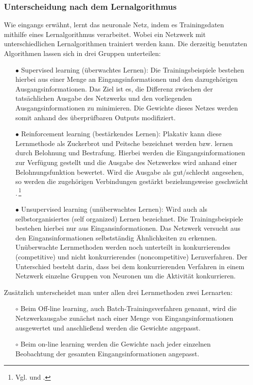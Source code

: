 \subsubsection{Unterscheidung nach dem Lernalgorithmus }
Wie eingangs erwähnt, lernt das neuronale Netz, indem es Trainingsdaten mithilfe eines Lernalgorithmus verarbeitet. Wobei ein Netzwerk mit unterschiedlichen Lernalgorithmen trainiert werden kann. Die derzeitig benutzten Algorithmen lassen sich in drei Gruppen unterteilen: 
\begin{itemize}
\item[\textbf{$\bullet$}] Supervised learning (überwachtes Lernen): Die Trainingsbeispiele bestehen hierbei aus einer Menge an Eingangsinformationen und den dazugehörigen Ausgangsinformationen. Das Ziel ist es, die Differenz zwischen der tatsächlichen Ausgabe des Netzwerks und den vorliegenden Ausgangsinformationen zu minimieren. Die Gewichte dieses Netzes werden somit anhand des überprüfbaren Outputs modifiziert.


\item[\textbf{$\bullet$}] Reinforcement learning (bestärkendes Lernen): Plakativ kann diese Lernmethode als Zuckerbrot und Peitsche bezeichnet werden bzw. lernen durch Belohnung und Bestrafung. Hierbei werden die Eingangsinformationen zur Verfügung gestellt und die Ausgabe des Netzwerkes wird anhand einer Belohnungsfunktion bewertet. Wird die Ausgabe als gut/schlecht angesehen, so werden die zugehörigen Verbindungen gestärkt beziehungsweise geschwächt .\,\footnote{Vgl. \citet[201]{dkriesel07} und \citet[A2.3:5]{Fiesler96}.}


\item[\textbf{$\bullet$}] Unsupervised learning (unüberwachtes Lernen): Wird auch als selbstorganisiertes (self organized) Lernen bezeichnet. Die Trainingsbeispiele bestehen hierbei nur aus Eingansinformationen. Das Netzwerk versucht aus den Eingansinformationen selbstständig Ähnlichkeiten zu erkennen. Unüberwachte Lernmethoden werden noch unterteilt in konkurrierendes (competitive) und nicht konkurrierendes (noncompetitive) Lernverfahren. Der Unterschied besteht darin, dass bei dem konkurrierenden Verfahren in einem Netzwerk einzelne Gruppen von Neuronen um die Aktivität konkurrieren.\,

\end{itemize}

Zusätzlich unterscheidet man unter allen drei Lernmethoden zwei Lernarten:\,

\begin{itemize}
\item[\textbf{$\circ$}] Beim Off-line learning, auch Batch-Trainingsverfahren genannt, wird die Netzwerkausgabe zunächst nach einer Menge von Eingangsinformationen ausgewertet und anschließend werden die Gewichte angepasst.


\item[\textbf{$\circ$}] Beim on-line learning werden die Gewichte nach jeder einzelnen Beobachtung der gesamten Eingangsinformationen angepasst.

\end{itemize}


